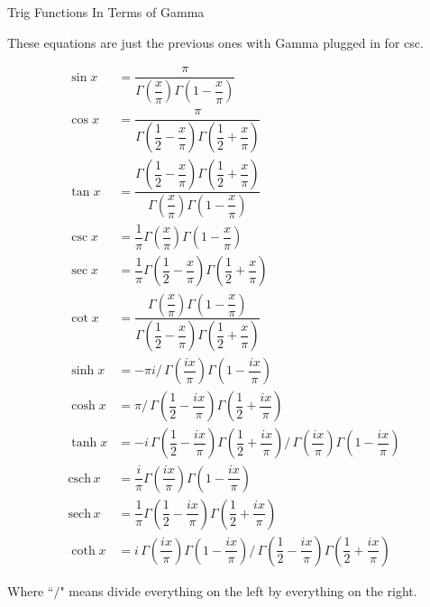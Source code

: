 \documentclass[12pt]{article}
\begin{document}
\pagebreak\begin{section}{Trig Functions In Terms of Gamma}

	\noindent These equations are just the previous ones with Gamma plugged in for csc.

	\begin{align} %
		\sin x & =\dfrac\pi{\Gamma\left(\dfrac x\pi\right)\Gamma\left(1-\dfrac x\pi\right)}\\
		\cos x & =\dfrac\pi{\Gamma\left(\dfrac12-\dfrac x\pi\right)\Gamma\left(\dfrac12+\dfrac x\pi\right)}\\
		\tan x & =\dfrac{\Gamma\left(\dfrac12-\dfrac x\pi\right)\Gamma\left(\dfrac12+\dfrac x\pi\right)}{\Gamma\left(\dfrac x\pi\right)\Gamma\left(1-\dfrac x\pi\right)}\\
		\csc x & =\dfrac1\pi\Gamma\left(\dfrac x\pi\right)\Gamma\left(1-\dfrac x\pi\right)\\
		\sec x & =\dfrac1\pi\Gamma\left(\dfrac12-\dfrac x\pi\right)\Gamma\left(\dfrac12+\dfrac x\pi\right)\\
		\cot x & =\dfrac{\Gamma\left(\dfrac x\pi\right)\Gamma\left(1-\dfrac x\pi\right)}{\Gamma\left(\dfrac12-\dfrac x\pi\right)\Gamma\left(\dfrac12+\dfrac x\pi\right)}\\
		\sinh x & =-\pi i\big/\,\Gamma\left(\dfrac{ix}\pi\right)\Gamma\left(1-\dfrac{ix}\pi\right)\\
		\cosh x & =\pi\big/\,\Gamma\left(\dfrac12-\dfrac{ix}\pi\right)\Gamma\left(\dfrac12+\dfrac{ix}\pi\right)\\
		\tanh x & =-i\,\Gamma\left(\dfrac12-\dfrac{ix}\pi\right)\Gamma\left(\dfrac12+\dfrac{ix}\pi\right)\big/\,\Gamma\left(\dfrac{ix}\pi\right)\Gamma\left(1-\dfrac{ix}\pi\right)\\
		\text{csch}\,x & =\dfrac i\pi\Gamma\left(\dfrac{ix}\pi\right)\Gamma\left(1-\dfrac{ix}\pi\right)\\
		\text{sech}\,x & =\dfrac1\pi\Gamma\left(\dfrac12-\dfrac{ix}\pi\right)\Gamma\left(\dfrac12+\dfrac{ix}\pi\right)\\
		\coth x & =i\,\Gamma\left(\dfrac{ix}\pi\right)\Gamma\left(1-\dfrac{ix}\pi\right)\big/\,\Gamma\left(\dfrac12-\dfrac{ix}\pi\right)\Gamma\left(\dfrac12+\dfrac{ix}\pi\right)
	\end{align}

	\noindent Where ``$\big/$" means divide everything on the left by everything on the right.
\end{section}
\end{document}
